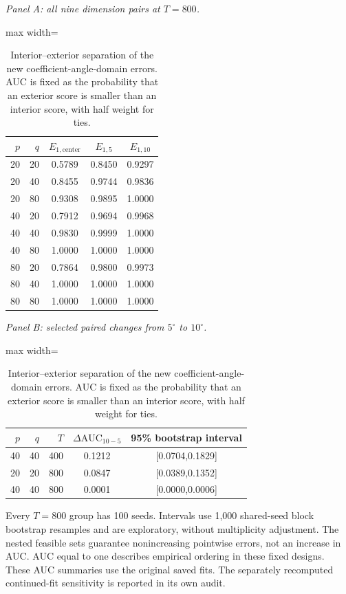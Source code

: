 \documentclass[12pt,letterpaper]{article}
\def\spacingset#1{\renewcommand{\baselinestretch}{#1}\small\normalsize}
\theoremstyle{plain}
\theoremstyle{definition}
\begin{document}
\begin{table}[p]
\begingroup
\spacingset{1.0}
\small\centering
\caption{Interior--exterior separation of the new coefficient-angle-domain errors. AUC is fixed as the probability that an exterior score is smaller than an interior score, with half weight for ties.}
\label{s23:lambda:selectedtab:cap_auc}
\footnotesize
\setlength{\tabcolsep}{4pt}
\renewcommand{\arraystretch}{1.03}
\textit{Panel A: all nine dimension pairs at $T=800$.}\par\smallskip
\begin{adjustbox}{max width=\linewidth}
\begin{tabular}{rrccc}
\toprule
$p$ & $q$ & $E_{1,\mathrm{center}}$ & $E_{1,5}$ & $E_{1,10}$\\
\midrule
20 & 20 & 0.5789 & 0.8450 & 0.9297\\
20 & 40 & 0.8455 & 0.9744 & 0.9836\\
20 & 80 & 0.9308 & 0.9895 & 1.0000\\
40 & 20 & 0.7912 & 0.9694 & 0.9968\\
40 & 40 & 0.9830 & 0.9999 & 1.0000\\
40 & 80 & 1.0000 & 1.0000 & 1.0000\\
80 & 20 & 0.7864 & 0.9800 & 0.9973\\
80 & 40 & 1.0000 & 1.0000 & 1.0000\\
80 & 80 & 1.0000 & 1.0000 & 1.0000\\
\bottomrule
\end{tabular}
\end{adjustbox}
\par\smallskip
\textit{Panel B: selected paired changes from $5^\circ$ to $10^\circ$.}\par\smallskip
\begin{adjustbox}{max width=\linewidth}
\begin{tabular}{rrrcc}
\toprule
$p$ & $q$ & $T$ & $\Delta\mathrm{AUC}_{10-5}$ & 95\% bootstrap interval\\
\midrule
40 & 40 & 400 & 0.1212 & [0.0704,0.1829]\\
20 & 20 & 800 & 0.0847 & [0.0389,0.1352]\\
40 & 40 & 800 & 0.0001 & [0.0000,0.0006]\\
\bottomrule
\end{tabular}
\end{adjustbox}
\par\smallskip
\begin{minipage}{0.98\linewidth}\footnotesize
Every $T=800$ group has 100 seeds. Intervals use 1,000 shared-seed block bootstrap resamples and are exploratory, without multiplicity adjustment. The nested feasible sets guarantee nonincreasing pointwise errors, not an increase in AUC. AUC equal to one describes empirical ordering in these fixed designs. These AUC summaries use the original saved fits. The separately recomputed continued-fit sensitivity is reported in its own audit.
\end{minipage}
\endgroup
\end{table}
\end{document}

